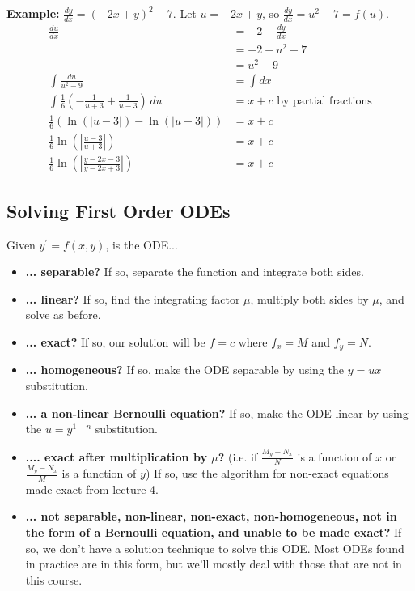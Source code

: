 \documentclass[11pt]{article}
\newcommand{\example}{\textbf{Example: }}
\newcommand{\fdx}{\frac{dy}{dx}} %
\newcommand{\yp}{y^{\prime}}
\begin{document}
	\example $\fdx = (-2x + y)^2 - 7$. Let $u = -2x + y$, so $\fdx = u^2 - 7 = f(u)$.
		\begin{align*}
			\frac{du}{dx} &= -2 + \fdx \\
				&= -2 + u^2 - 7 \\
				&= u^2 - 9 \\
			\int \frac{du}{u^2 - 9} &= \int dx \\
			\int \frac{1}{6} \left(- \frac{1}{u+3} + \frac{1}{u-3}\right)\,du &= x + c \text{ by partial fractions} \\
			\frac{1}{6}(\ln(|u - 3|) - \ln(|u+3|)) &= x + c \\
			\frac{1}{6} \ln\left(\left|\frac{u - 3}{u + 3}\right|\right) &= x + c \\
			\frac{1}{6} \ln\left(\left|\frac{y - 2x - 3}{y - 2x + 3}\right|\right) &= x + c
		\end{align*}

\subsection{Solving First Order ODEs}
	Given $\yp = f(x,y)$, is the ODE...
	\begin{itemize}
		\item \textbf{... separable?} If so, separate the function and integrate both sides.
		\item \textbf{... linear?} If so, find the integrating factor $\mu$, multiply both sides by $\mu$, and solve as before.
		\item \textbf{... exact?} If so, our solution will be $f = c$ where $f_x = M$ and $f_y = N$.
		\item \textbf{... homogeneous?} If so, make the ODE separable by using the $y = ux$ substitution.
		\item \textbf{... a non-linear Bernoulli equation?} If so, make the ODE linear by using the $u = y^{1-n}$ substitution.
		\item \textbf{.... exact after multiplication by $\mu$?} (i.e. if $\frac{M_y - N_x}{N}$ is a function of $x$ or $\frac{M_y - N_x}{M}$ is a function of $y$) If so, use the algorithm for non-exact equations made exact from lecture 4.
		\item \textbf{... not separable, non-linear, non-exact, non-homogeneous, not in the form of a Bernoulli equation, and unable to be made exact?} If so, we don't have a solution technique to solve this ODE. Most ODEs found in practice are in this form, but we'll mostly deal with those that are not in this course.
	\end{itemize}
\end{document}

